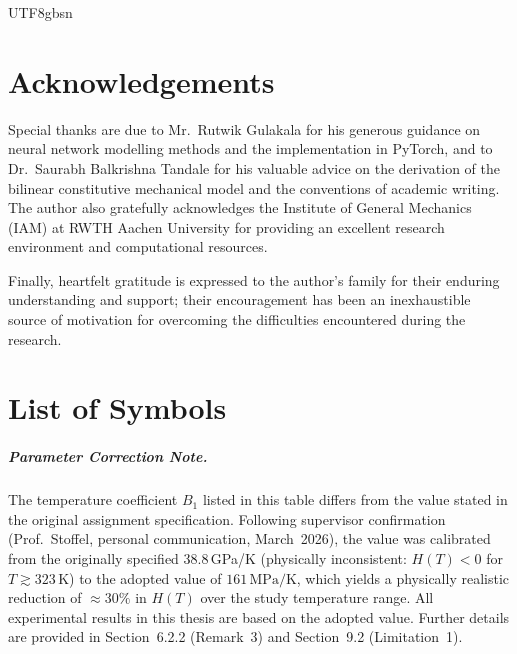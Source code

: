 \documentclass[a4paper,12pt]{report}
\newenvironment{acknowledgement}{%
  \chapter*{Acknowledgements}\addcontentsline{toc}{chapter}{Acknowledgements}
  \fontsize{11}{14}\selectfont\setlength{\baselineskip}{20pt}\noindent\ignorespaces
}{\par}
\begin{document}
\begin{CJK}{UTF8}{gbsn}
\begin{acknowledgement}
Special thanks are due to Mr.\ Rutwik Gulakala for his generous guidance on neural
network modelling methods and the implementation in PyTorch, and to Dr.\ Saurabh Balkrishna
Tandale for his valuable advice on the derivation of the bilinear constitutive mechanical
model and the conventions of academic writing. The author also gratefully acknowledges
the Institute of General Mechanics (IAM) at RWTH Aachen University for providing an
excellent research environment and computational resources.

Finally, heartfelt gratitude is expressed to the author's family for their enduring
understanding and support; their encouragement has been an inexhaustible source of
motivation for overcoming the difficulties encountered during the research.
\end{acknowledgement}

\appendix

\chapter{List of Symbols}
\label{app:symbols}

\paragraph*{Parameter Correction Note.}
The temperature coefficient $B_1$ listed in this table differs from the value stated in
the original assignment specification. Following supervisor confirmation (Prof.\ Stoffel,
personal communication, March~2026), the value was calibrated from the originally
specified 38.8\,GPa/K (physically inconsistent: $H(T)<0$ for $T\gtrsim323$\,K) to the
adopted value of $161\,\mathrm{MPa/K}$, which yields a physically realistic reduction of
$\approx30\%$ in $H(T)$ over the study temperature range. All experimental results in
this thesis are based on the adopted value. Further details are provided in
Section~6.2.2 (Remark~3) and Section~9.2 (Limitation~1).


\end{CJK}
\end{document}
